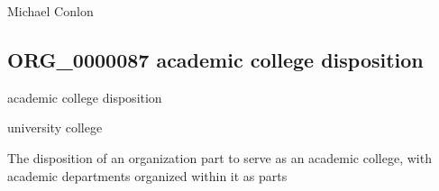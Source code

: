 \documentclass[letterpaper,10pt,english]{sphinxmanual}
\begin{document}
\begin{sphinxShadowBox}

\sphinxAtStartPar
{}
\end{sphinxShadowBox}

\begin{sphinxShadowBox}

\sphinxAtStartPar
Michael Conlon 
\end{sphinxShadowBox}
\begin{quote}

\ignorespaces \end{quote}


\subsection{ORG\_0000087 \sphinxhyphen{} academic college disposition}
\label{\detokenize{doc-ORG_0000087:org-0000087-academic-college-disposition}}\label{\detokenize{doc-ORG_0000087:index-0}}\label{\detokenize{doc-ORG_0000087::doc}}
\begin{sphinxShadowBox}

\sphinxAtStartPar
academic college disposition
\end{sphinxShadowBox}

\begin{sphinxShadowBox}

\sphinxAtStartPar
university college
\end{sphinxShadowBox}

\begin{sphinxShadowBox}

\sphinxAtStartPar
{\hyperref[\detokenize{doc-BFO_0000016::doc}]{}}
\end{sphinxShadowBox}

\begin{sphinxShadowBox}

\sphinxAtStartPar
The disposition of an organization part to serve as an academic college, with academic departments organized within it as parts
\end{sphinxShadowBox}
\end{document}
